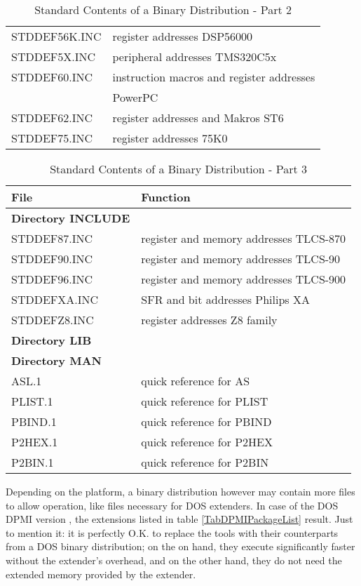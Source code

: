 \documentclass[12pt,twoside]{report}
\begin{document}
\begin{table*}[htp]
\begin{center}
\begin{tabular}{|l|l|}
STDDEF56K.INC     & register addresses DSP56000 \\
STDDEF5X.INC      & peripheral addresses TMS320C5x \\
STDDEF60.INC      & instruction macros and register addresses \\
                  & PowerPC \\
STDDEF62.INC      & register addresses and Makros ST6 \\
STDDEF75.INC      & register addresses 75K0 \\
\hline
\end{tabular}\end{center}
\caption{Standard Contents of a Binary Distribution - Part 2
         \label{TabCommonPackageList2}}
\end{table*}
\begin{table*}[htp]
\begin{center}\begin{tabular}{|l|l|}
\hline
File              & Function \\
\hline
\hline
{\bf Directory INCLUDE} & \\
\hline
STDDEF87.INC      & register and memory addresses TLCS-870 \\
STDDEF90.INC      & register and memory addresses TLCS-90 \\
STDDEF96.INC      & register and memory addresses TLCS-900 \\
STDDEFXA.INC      & SFR and bit addresses Philips XA \\
STDDEFZ8.INC      & register addresses Z8 family \\
\hline
\hline
{\bf Directory LIB} & \\
\hline
\hline
{\bf Directory MAN} & \\
\hline
ASL.1             & quick reference for AS \\
PLIST.1           & quick reference for PLIST \\
PBIND.1           & quick reference for PBIND \\
P2HEX.1           & quick reference for P2HEX \\
P2BIN.1           & quick reference for P2BIN \\
\hline
\end{tabular}\end{center}
\caption{Standard Contents of a Binary Distribution - Part 3
         \label{TabCommonPackageList3}}
\end{table*}


Depending on the platform, a binary distribution however may contain more
files to allow operation, like files necessary for DOS extenders. In case
of the DOS DPMI version , the extensions listed in
table \ref{TabDPMIPackageList} result.  Just to mention it: it is
perfectly O.K. to replace the tools with their counterparts from a DOS
binary distribution; on the on hand, they execute significantly faster
without the extender's overhead, and on the other hand, they do not need
the extended memory provided by the extender.
\end{document}
